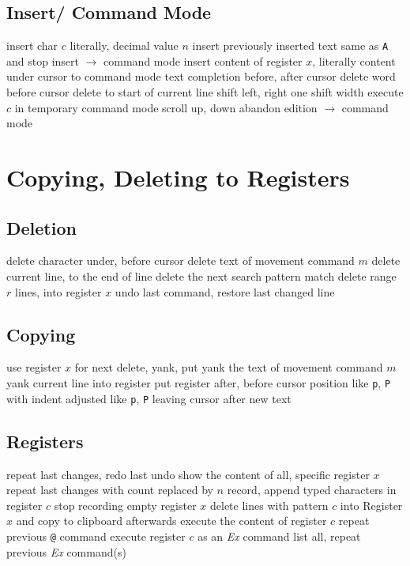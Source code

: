 \subsection{Insert/ Command Mode}	{}
	{insert char $c$ literally, decimal value $n$}
	{insert previously inserted text}
	{same as {\tt\ctrl A} and stop insert $\to$ command mode}
	{insert content of register $x$, literally}
	{content under cursor to command mode}
	{text completion before, after cursor}
	{delete word before cursor}
	{delete to start of current line}
	{shift left, right one shift width}
	{execute $c$ in temporary command mode}
	{scroll up, down}
	{abandon edition $\to$ command mode}

\section{Copying, Deleting to Registers}	{}

\subsection{Deletion}	{}
	{delete character under, before cursor}
	{delete text of movement command $m$}
	{delete current line, to the end of line}
	{delete the next search pattern match}
	{delete range $r$ lines, into register $x$}
	{undo last command, restore last changed line}

\subsection{Copying}	{}
	{use register $x$ for next delete, yank, put}
	{yank the text of movement command $m$}
	{yank current line into register}
	{put register after, before cursor position}
	{like {\tt p}, {\tt P} with indent adjusted}
	{like {\tt p}, {\tt P} leaving cursor after new text}

\subsection{Registers}{}
	{repeat last changes, redo last undo}
	{show the content of all, specific register $x$}
	{repeat last changes with count replaced by $n$ }
	{record, append typed characters in register $c$}
	{stop recording}
	{empty register $x$}
	{delete lines with pattern $c$ into Register $x$ and copy to clipboard afterwards}
	{execute the content of register $c$}
	{repeat previous {\tt @} command}
	{execute register $c$ as an {\it Ex\/} command}
	{list all, repeat previous {\it Ex\/} command(s)}

